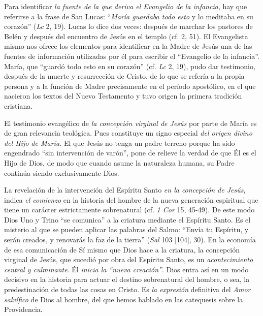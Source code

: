 \documentclass[]{article}
\begin{document}
Para identificar \emph{la fuente de la que deriva el Evangelio de la
infancia}, hay que referirse a la frase de San Lucas: ``\emph{María
guardaba todo esto} y lo meditaba en su corazón'' (\emph{Lc} 2, 19).
Lucas lo dice dos veces: después de marchar los pastores de Belén y
después del encuentro de Jesús en el templo (cf. 2, 51). El Evangelista
mismo nos ofrece los elementos para identificar en la Madre de Jesús una
de las fuentes de información utilizadas por él para escribir el
``Evangelio de la infancia''. María, que ``guardó todo esto en su
corazón'' (cf. \emph{Lc} 2, 19), pudo dar testimonio, después de la
muerte y resurrección de Cristo, de lo que se refería a la propia
persona y a la función de Madre precisamente en el período apostólico,
en el que nacieron los textos del Nuevo Testamento y tuvo origen la
primera tradición cristiana.

El testimonio evangélico de \emph{la concepción virginal de Jesús} por
parte de María es de gran relevancia teológica. Pues constituye un signo
especial \emph{del origen divino del Hijo de María.} El que Jesús no
tenga un padre terreno porque ha sido engendrado ``sin intervención de
varón'', pone de relieve la verdad de que Él es el Hijo de Dios, de modo
que cuando asume la naturaleza humana, su Padre continúa siendo
exclusivamente Dios.

La revelación de la intervención del Espíritu Santo \emph{en la
concepción de Jesús}, indica \emph{el comienzo} en la historia del
hombre de la nueva generación espiritual que tiene un carácter
estrictamente sobrenatural (cf. \emph{1 Cor} 15, 45-49). De este modo
Dios Uno y Trino ``se comunica'' a la criatura mediante el Espíritu
Santo. Es el misterio al que se pueden aplicar las palabras del Salmo:
``Envía tu Espíritu, y serán creados, y renovarás la faz de la tierra''
(\emph{Sal} 103 {[}104{]}, 30). En la economía de esa comunicación de Sí
mismo que Dios hace a la criatura, la concepción virginal de Jesús, que
sucedió por obra del Espíritu Santo, es un \emph{acontecimiento central
y culminante}. Él \emph{inicia la ``nueva creación''}. Dios entra así en
un modo decisivo en la historia para actuar el destino sobrenatural del
hombre, o sea, la predestinación de todas las cosas en Cristo. Es
\emph{la expresión} definitiva del \emph{Amor salvífico} de Dios al
hombre, del que hemos hablado en las catequesis sobre la Providencia.
\end{document}
